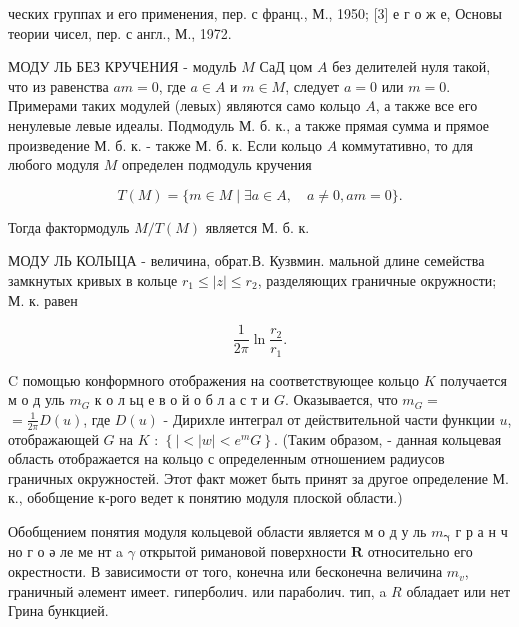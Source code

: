 \documentclass[10pt]{article}
\begin{document}
ческих группах и его применения, пер. с франц., М., 1950; [3] е г о ж е, Основы теории чисел, пер. с англ., М., 1972.



МОДУ ЛЬ БЕЗ КРУЧЕНИЯ - модулЬ $M$ СаД цом $A$ без делителей нуля такой, что из равенства $a m=0$, где $a \in A$ и $m \in M$, следует $a=0$ или $m=0$. Примерами таких модулей (левых) являются само кольцо $A$, а также все его ненулевые левые идеалы. Подмодуль М. б. к., а также прямая сумма и прямое произведение М. б. к. - также М. б. к. Если кольцо $A$ коммутативно, то для любого модуля $M$ определен подмодуль кручения



\[

T(M)=\{m \in M \mid \exists a \in A, \quad a \neq 0, a m=0\} .

\]



Тогда фактормодуль $M / T(M)$ является М. б. к.



МОДУ ЛЬ КОЛЫЦА - величина, обрат.В. Кузвмин. мальной длине семейства замкнутых кривых в кольце $r_{1} \leqslant|z| \leqslant r_{2}$, разделяющих граничные окружности; М. к. равен



\[

\frac{1}{2 \pi} \ln \frac{r_{2}}{r_{1}} .

\]



C помощью конформного отображения на соответствующее кольцо $K$ получается м о д уль $m_{G}$ к о л ьц е в о й о б л а с т и $G$. Оказывается, что $m_{G}=$ $=\frac{1}{2 \pi} D(u)$, где $D(u)$ - Дирихле интеграл от деӥствительной части функции $u$, отображающей $G$ на $K$ : $\left\{|<| w \mid<e^{m} G\right\}$. (Таким образом, - данная кольцевая область отображается на кольцо с определенным отношением радиусов граничных окружностей. Этот факт может быть принят за другое определение М. к., обобщение к-рого ведет к понятию модуля плоской области.)



Обобщением понятия модуля кольцевой области является м о д у ль $m_{\boldsymbol{\gamma}}$ г р а н ч но г о ә ле ме нт a $\gamma$ открытой римановой поверхности $\boldsymbol{R}$ относительно его окрестности. В зависимости от того, конечна или бесконечна величина $m_{v}$, граничный әлемент имеет. гиперболич. или параболич. тип, a $R$ обладает или нет Грина бункцией.
\end{document}
